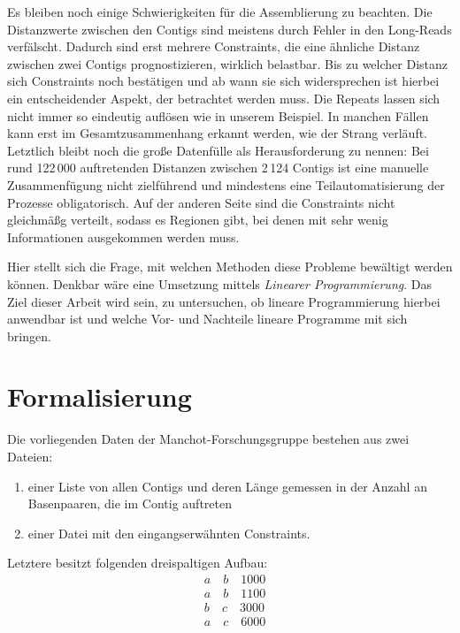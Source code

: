 Es bleiben noch einige Schwierigkeiten für die Assemblierung zu beachten. Die Distanzwerte zwischen den Contigs sind meistens durch Fehler in den Long-Reads verfälscht. Dadurch sind erst mehrere Constraints, die eine ähnliche Distanz zwischen zwei Contigs prognostizieren, wirklich belastbar. Bis zu welcher Distanz sich Constraints noch bestätigen und ab wann sie sich widersprechen ist hierbei ein entscheidender Aspekt, der betrachtet werden muss. Die Repeats lassen sich nicht immer so eindeutig auflösen wie in unserem Beispiel. In manchen Fällen kann erst im Gesamtzusammenhang erkannt werden, wie der Strang verläuft. Letztlich bleibt noch die große Datenfülle als Herausforderung zu nennen: Bei rund 122\,000 auftretenden Distanzen zwischen 2\,124 Contigs ist eine manuelle Zusammenfügung nicht zielführend und mindestens eine Teilautomatisierung der Prozesse obligatorisch. Auf der anderen Seite sind die Constraints nicht gleichmäßg verteilt, sodass es Regionen gibt, bei denen mit sehr wenig Informationen ausgekommen werden muss.

Hier stellt sich die Frage, mit welchen Methoden diese Probleme bewältigt werden können. Denkbar wäre eine Umsetzung mittels 
\emph{Linearer Programmierung}. Das Ziel dieser Arbeit wird sein, zu untersuchen, ob lineare Programmierung hierbei anwendbar ist
 und welche Vor- und Nachteile lineare Programme mit sich bringen.



\chapter{Formalisierung}\raggedbottom 

Die vorliegenden Daten der Manchot-Forschungsgruppe bestehen aus zwei Dateien: 
\begin{enumerate}
	\item einer Liste von allen Contigs und deren Länge gemessen in der Anzahl an Basenpaaren, die im Contig auftreten
	\item einer Datei mit den eingangserwähnten Constraints.
\end{enumerate}
Letztere besitzt folgenden dreispaltigen Aufbau:
\begin{align*}
&a \quad b \quad 1000\\
&a \quad b \quad 1100\\
&b \quad c \quad 3000\\
&a \quad c \quad 6000
\end{align*}


